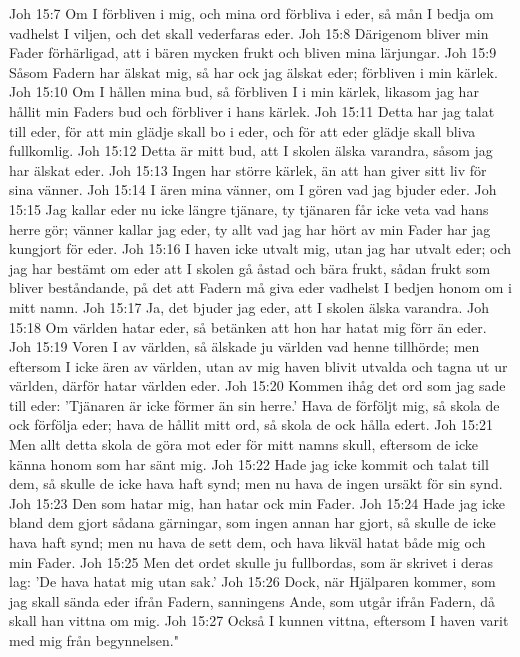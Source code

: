 Joh 15:7  Om I förbliven i mig, och mina ord förbliva i eder, så mån I bedja om vadhelst I viljen, och det skall vederfaras eder.
Joh 15:8  Därigenom bliver min Fader förhärligad, att i bären mycken frukt och bliven mina lärjungar.
Joh 15:9  Såsom Fadern har älskat mig, så har ock jag älskat eder; förbliven i min kärlek.
Joh 15:10  Om I hållen mina bud, så förbliven I i min kärlek, likasom jag har hållit min Faders bud och förbliver i hans kärlek.
Joh 15:11  Detta har jag talat till eder, för att min glädje skall bo i eder, och för att eder glädje skall bliva fullkomlig.
Joh 15:12  Detta är mitt bud, att I skolen älska varandra, såsom jag har älskat eder.
Joh 15:13  Ingen har större kärlek, än att han giver sitt liv för sina vänner.
Joh 15:14  I ären mina vänner, om I gören vad jag bjuder eder.
Joh 15:15  Jag kallar eder nu icke längre tjänare, ty tjänaren får icke veta vad hans herre gör; vänner kallar jag eder, ty allt vad jag har hört av min Fader har jag kungjort för eder.
Joh 15:16  I haven icke utvalt mig, utan jag har utvalt eder; och jag har bestämt om eder att I skolen gå åstad och bära frukt, sådan frukt som bliver beståndande, på det att Fadern må giva eder vadhelst I bedjen honom om i mitt namn.
Joh 15:17  Ja, det bjuder jag eder, att I skolen älska varandra.
Joh 15:18  Om världen hatar eder, så betänken att hon har hatat mig förr än eder.
Joh 15:19  Voren I av världen, så älskade ju världen vad henne tillhörde; men eftersom I icke ären av världen, utan av mig haven blivit utvalda och tagna ut ur världen, därför hatar världen eder.
Joh 15:20  Kommen ihåg det ord som jag sade till eder: 'Tjänaren är icke förmer än sin herre.' Hava de förföljt mig, så skola de ock förfölja eder; hava de hållit mitt ord, så skola de ock hålla edert.
Joh 15:21  Men allt detta skola de göra mot eder för mitt namns skull, eftersom de icke känna honom som har sänt mig.
Joh 15:22  Hade jag icke kommit och talat till dem, så skulle de icke hava haft synd; men nu hava de ingen ursäkt för sin synd.
Joh 15:23  Den som hatar mig, han hatar ock min Fader.
Joh 15:24  Hade jag icke bland dem gjort sådana gärningar, som ingen annan har gjort, så skulle de icke hava haft synd; men nu hava de sett dem, och hava likväl hatat både mig och min Fader.
Joh 15:25  Men det ordet skulle ju fullbordas, som är skrivet i deras lag: 'De hava hatat mig utan sak.'
Joh 15:26  Dock, när Hjälparen kommer, som jag skall sända eder ifrån Fadern, sanningens Ande, som utgår ifrån Fadern, då skall han vittna om mig.
Joh 15:27  Också I kunnen vittna, eftersom I haven varit med mig från begynnelsen."
